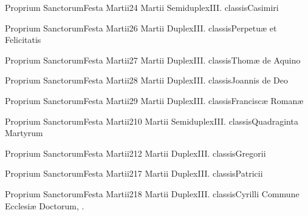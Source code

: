 \documentclass[nocturnale-romanum.tex]{subfiles}
\begin{document}

	{Proprium Sanctorum}{Festa Martii}{2}{4 Martii}
	{Semiduplex}{III. classis}{Casimiri}
	{}
	{}

	{Proprium Sanctorum}{Festa Martii}{2}{6 Martii}
	{Duplex}{III. classis}{Perpetuæ et Felicitatis}
	{}
	{}

	{Proprium Sanctorum}{Festa Martii}{2}{7 Martii}
	{Duplex}{III. classis}{Thomæ de Aquino}
	{}
	{}

	{Proprium Sanctorum}{Festa Martii}{2}{8 Martii}
	{Duplex}{III. classis}{Joannis de Deo}
	{}
	{}

	{Proprium Sanctorum}{Festa Martii}{2}{9 Martii}
	{Duplex}{III. classis}{Franciscæ Romanæ}
	{}
	{}

	{Proprium Sanctorum}{Festa Martii}{2}{10 Martii}
	{Semiduplex}{III. classis}{Quadraginta Martyrum}
	{}
	{}

	{Proprium Sanctorum}{Festa Martii}{2}{12 Martii}
	{Duplex}{III. classis}{Gregorii}
	{}
	{}

	{Proprium Sanctorum}{Festa Martii}{2}{17 Martii}
	{Duplex}{III. classis}{Patricii}
	{}
	{}

	{Proprium Sanctorum}{Festa Martii}{2}{18 Martii}
	{Duplex}{III. classis}{Cyrilli}
	{Commune Ecclesiæ Doctorum, \pageref{M-CODO}.}
	{}
\end{document}
